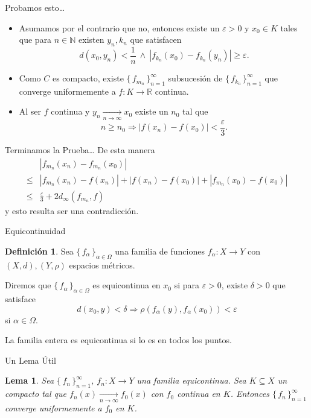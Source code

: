 \documentclass[utf8]{beamer}
\theoremstyle{plain}
\newtheorem{Lem}{Lema}                 %
\theoremstyle{definition}
\newtheorem{Def}{Definición}           %
\theoremstyle{remark}
\numberwithin{equation}{section}
\newcommand{\al}{\alpha}                %
\newcommand{\dl}{\delta}                %
\newcommand{\eps}{\varepsilon}          %
\newcommand{\Om}{\Omega}                %
\newcommand{\bN}{\mathbb{N}}    %
\newcommand{\bR}{\mathbb{R}}    %
\newcommand{\set}[1]{\{\,#1\,\}}    %
\renewcommand{\geq}{\geqslant}          %
\renewcommand{\leq}{\leqslant}          %
\newcommand{\To}{\Rightarrow}
\newcommand{\sucn}{_{n=1}^\infty} %
\begin{document}
\begin{frame}{Probamos esto\dots}
  \begin{itemize}
    \item Asumamos por el contrario que no, entonces existe un $\eps>0$ y $x_0\in K$ tales que para $n\in\bN$ existen $y_n,k_n$ que satisfacen
    $$d(x_0,y_n)<\frac1n\ \land\ |f_{k_n}(x_0)-f_{k_n}(y_n)|\geq\eps.$$
    \item Como $C$ es compacto, existe $\set{f_{m_n}}\sucn$ subsucesión de $\set{f_{k_n}}\sucn$ que converge uniformemente a $f: K\to\bR$ continua.
    \item Al ser $f$ continua y $y_n\xrightarrow[n\to\infty]{}x_0$ existe un $n_0$ tal que 
    $$n\geq n_0\To |f(x_n)-f(x_0)|<\frac{\eps}{3}.$$
  \end{itemize}
\end{frame}

\begin{frame}{Terminamos la Prueba\dots}
  De esta manera
  \begin{align*}
    &|f_{m_n}(x_n)-f_{m_n}(x_0)|\\
    \leq&|f_{m_n}(x_n)-f(x_n)|+|f(x_n)-f(x_0)|+|f_{m_n}(x_0)-f(x_0)|\\
    \leq&\frac{\eps}{3}+2d_\infty(f_{m_n},f)
  \end{align*}
  y esto resulta ser una contradicción.%
\end{frame}

\begin{frame}{Equicontinuidad}
  \begin{Def}\label{def:equicontinuidad}
    Sea $\set{f_\al}_{\al\in\Om}$ una familia de funciones $f_\al:X\to Y$ con $(X,d),(Y,\rho)$ espacios métricos.\par 
Diremos que $\set{f_\al}_{\al\in\Om}$ es \alert{equicontinua} en $x_0$ si para $\eps>0$, existe $\dl>0$ que satisface
$$d(x_0,y)<\dl\To\rho(f_\al(y),f_\al(x_0))<\eps$$
si $\al\in\Om$.\par
La familia entera es equicontinua si lo es en todos los puntos.
  \end{Def}
\end{frame}

\begin{frame}{Un Lema Útil}
  \begin{Lem}\label{lem:equicontToUnifConv}
    Sea $\set{f_n}\sucn$, $f_n: X\to Y$ una familia equicontinua. Sea $K\subseteq X$ un compacto tal que $f_n(x)\xrightarrow[n\to\infty]{}f_0(x)$ con $f_0$ continua en $K$. Entonces $\set{f_n}\sucn$ converge uniformemente a $f_0$ en $K$.
  \end{Lem}
\end{frame}
\end{document}
